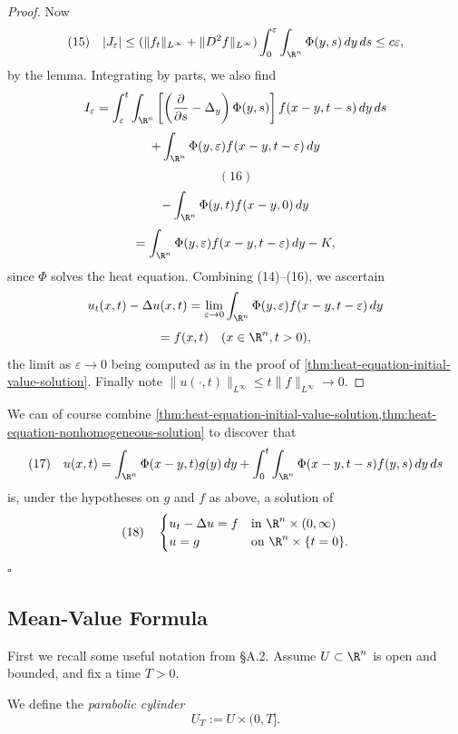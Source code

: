 \begin{proof}
Now
$$(15) \quad |J_\varepsilon| \leq (\|f_t\|_{L^\infty} + \|D^2 f\|_{L^\infty}) \int_0^\varepsilon \int_{\R^n} \Phi(y,s) \, dy\,ds \leq c\varepsilon,$$
by the lemma. Integrating by parts, we also find
$$I_\varepsilon = \int_\varepsilon^t \int_{\R^n} \left[\left(\frac{\partial}{\partial s} - \Delta_y\right)\Phi(y,s)\right] f(x-y, t-s) \, dy\,ds$$
$$+ \int_{\R^n} \Phi(y,\varepsilon) f(x-y, t-\varepsilon) \, dy$$
$$(16)$$
$$- \int_{\R^n} \Phi(y,t) f(x-y, 0) \, dy$$
$$= \int_{\R^n} \Phi(y,\varepsilon) f(x-y, t-\varepsilon) \, dy - K,$$
since $\Phi$ solves the heat equation. Combining (14)--(16), we ascertain
$$u_t(x,t) - \Delta u(x,t) = \lim_{\varepsilon \to 0} \int_{\R^n} \Phi(y,\varepsilon) f(x-y, t-\varepsilon) \, dy$$
$$= f(x,t) \quad (x \in \R^n, t > 0),$$
the limit as $\varepsilon \to 0$ being computed as in the proof of \cref{thm:heat-equation-initial-value-solution}. Finally note $\|u(\cdot,t)\|_{L^\infty} \leq t\|f\|_{L^\infty} \to 0$.
\end{proof}

\begin{remark}
\label{rem:heat-equation-duhamel-combined}
We can of course combine \cref{thm:heat-equation-initial-value-solution,thm:heat-equation-nonhomogeneous-solution} to discover that
$$(17) \quad u(x,t) = \int_{\R^n} \Phi(x-y,t) g(y) \, dy + \int_0^t \int_{\R^n} \Phi(x-y, t-s) f(y,s) \, dy\,ds$$
is, under the hypotheses on $g$ and $f$ as above, a solution of
$$(18) \quad \begin{cases} u_t - \Delta u = f & \text{in } \R^n \times (0,\infty) \\ u = g & \text{on } \R^n \times \{t = 0\}. \end{cases}$$
$\square$
\end{remark}

\subsection{Mean-Value Formula}
\label{sec:heat-mean-value-formula}

First we recall some useful notation from \S A.2. Assume $U \subset \R^n$ is open and bounded, and fix a time $T > 0$.

\begin{definition}
\label{def:parabolic-cylinder-heat-ball}
\leanok
We define the \textit{parabolic cylinder}
$$U_T := U \times (0,T].$$
\end{definition}

